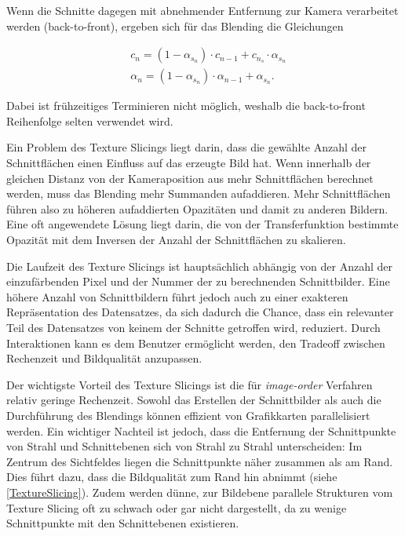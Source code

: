 \documentclass[a4paper,fontsize=12pt,toc=bib,parskip=half,ngerman]{scrartcl}
\begin{document}
Wenn die Schnitte dagegen mit abnehmender Entfernung zur Kamera verarbeitet werden (back-to-front), ergeben sich f\"ur das Blending die Gleichungen

\begin{align}
&c_n = (1-\alpha_{s_n})\cdot c_{n-1}+c_{n_s}\cdot\alpha_{s_n}
\label{back-to-front-color}\\ 
&\alpha_n = (1-\alpha_{s_n})\cdot\alpha_{n-1} + \alpha_{s_n}.
\label{back-to-front-alpha}
\end{align}

Dabei ist fr\"uhzeitiges Terminieren nicht m\"oglich, weshalb die back-to-front Reihenfolge selten verwendet wird.

Ein Problem des Texture Slicings liegt darin, dass die gew\"ahlte Anzahl der Schnittfl\"achen einen Einfluss auf das erzeugte Bild hat. Wenn innerhalb der gleichen Distanz von der Kameraposition aus mehr Schnittfl\"achen berechnet werden, muss das Blending mehr Summanden aufaddieren. Mehr Schnittfl\"achen f\"uhren also zu h\"oheren aufaddierten Opazit\"aten und damit zu anderen Bildern. Eine oft angewendete L\"osung liegt darin, die von der Transferfunktion bestimmte Opazit\"at mit dem Inversen der Anzahl der Schnittfl\"achen zu skalieren.

Die Laufzeit des Texture Slicings ist haupts\"achlich abh\"angig von der Anzahl der einzuf\"arbenden Pixel und der Nummer der zu berechnenden Schnittbilder. Eine h\"ohere Anzahl von Schnittbildern f\"uhrt jedoch auch zu einer exakteren Repr\"asentation des Datensatzes, da sich dadurch die Chance, dass ein relevanter Teil des Datensatzes von keinem der Schnitte getroffen wird, reduziert. Durch Interaktionen kann es dem Benutzer erm\"oglicht werden, den Tradeoff zwischen Rechenzeit und Bildqualit\"at anzupassen.

Der wichtigste Vorteil des Texture Slicings ist die f\"ur \textit{image-order} Verfahren relativ geringe Rechenzeit. Sowohl das Erstellen der Schnittbilder als auch die Durchf\"uhrung des Blendings k\"onnen effizient von Grafikkarten parallelisiert werden. Ein wichtiger Nachteil ist jedoch, dass die Entfernung der Schnittpunkte von Strahl und Schnittebenen sich von Strahl zu Strahl unterscheiden: Im Zentrum des Sichtfeldes liegen die Schnittpunkte n\"aher zusammen als am Rand. Dies f\"uhrt dazu, dass die Bildqualit\"at zum Rand hin abnimmt (siehe \cref{TextureSlicing}). Zudem werden d\"unne, zur Bildebene parallele Strukturen vom Texture Slicing oft zu schwach oder gar nicht dargestellt, da zu wenige Schnittpunkte mit den Schnittebenen existieren.
\end{document}
